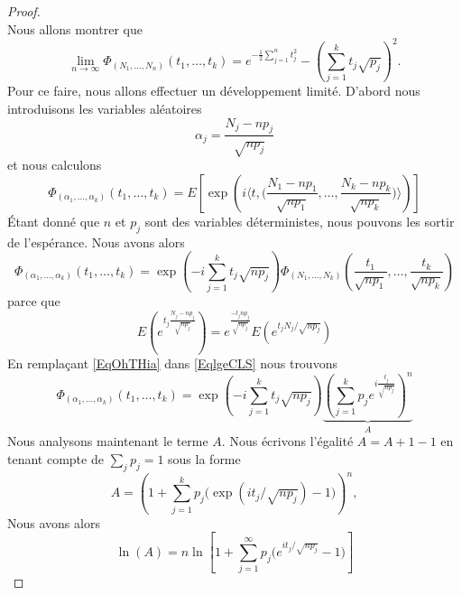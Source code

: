 \begin{proof}
\begin{subequations}
    \end{subequations}
    Nous allons montrer que
    \begin{equation}
        \lim_{n\to \infty} \Phi_{(N_1,\ldots, N_n)}(t_1,\ldots, t_k)= e^{-\frac{ 1 }{2}\sum_{j=1}^nt_j^2}-\left( \sum_{j=1}^kt_j\sqrt{p_j} \right)^2.
    \end{equation}
    Pour ce faire, nous allons effectuer un développement limité. D'abord nous introduisons les variables aléatoires
    \begin{equation}        \label{EqmdROCD}
        \alpha_j=\frac{ N_j-np_j }{ \sqrt{np_j} }
    \end{equation}
    et nous calculons
    \begin{equation}
        \Phi_{(\alpha_1,\ldots, \alpha_k)}(t_1,\ldots, t_k)=E\left[ \exp\left( i\langle t, \big( \frac{ N_1-np_1 }{ \sqrt{np_1} },\ldots, \frac{ N_k-np_k }{ \sqrt{np_k} } \big)\rangle  \right) \right]
    \end{equation}
    Étant donné que \( n\) et \( p_j\) sont des variables déterministes, nous pouvons les sortir de l'espérance. Nous avons alors
    \begin{equation}        \label{EqlgeCLS}
        \Phi_{(\alpha_1,\ldots, \alpha_k)}(t_1,\ldots, t_k)= \exp\left( -i\sum_{j=1}^kt_j\sqrt{np_j} \right)\Phi_{(N_1,\ldots, N_k)}\left( \frac{ t_1 }{ \sqrt{np_1} },\ldots, \frac{ t_k }{ \sqrt{np_k} } \right)
    \end{equation}
    parce que
    \begin{equation}
        E\left(  e^{t_j\frac{ N_j-np_j }{ \sqrt{np_j} }} \right)= e^{\frac{ -t_jnp_j }{ \sqrt{np_j} }}E\left(  e^{t_jN_j/\sqrt{np_j}} \right)
    \end{equation}
    En remplaçant \eqref{EqOhTHia} dans \eqref{EqlgeCLS} nous trouvons
    \begin{equation}        \label{EqrUYsnD}
        \Phi_{(\alpha_1,\ldots, \alpha_k)}(t_1,\ldots, t_k)=\exp\left( -i\sum_{j=1}^kt_j\sqrt{np_j} \right)\underbrace{\left( \sum_{j=1}^kp_j e^{i\frac{ t_j }{ \sqrt{np_j} }} \right)^n}_{A}
    \end{equation}
    Nous analysons maintenant le terme $A$. Nous écrivons l'égalité \( A=A+1-1\) en tenant compte de $\sum_{j}p_j=1$ sous la forme
    \begin{equation}
        A=\left( 1+\sum_{j=1}^kp_j\big( \exp(it_j/\sqrt{np_j})-1 \big) \right)^n,
    \end{equation}
    Nous avons alors
    \begin{equation}
        \ln(A)=n\ln\left[ 1+\sum_{j=1}^{\infty}p_j\big( e^{ it_j/\sqrt{np_j}}-1) \right]

\end{equation}
\end{proof}
